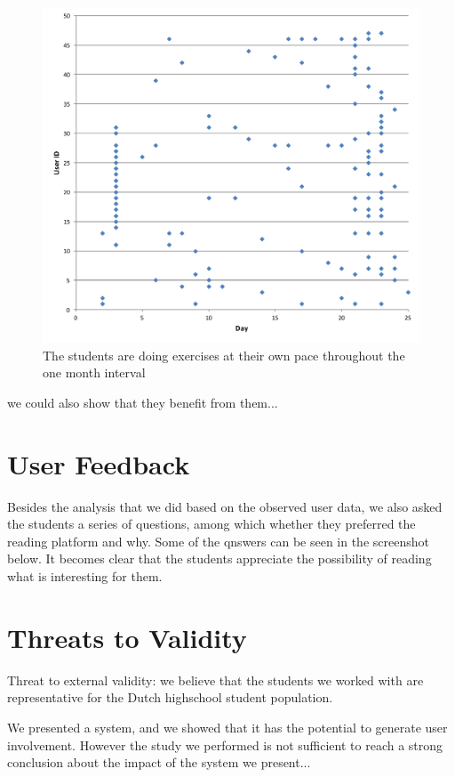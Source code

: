 \begin{figure}[h!]
\centering
  \includegraphics[width=\columnwidth]{figures/user_exercise_activity_vs_day.pdf}
  \caption{The students are doing exercises at their own pace throughout the one month interval }
\end{figure}

we could also show that they benefit from them... 



\section{User Feedback}

Besides the analysis that we did based on the observed user data, we also asked the students a series of questions, among which whether they preferred the reading platform and why. Some of the qnswers can be seen in the screenshot below. It becomes clear that the students appreciate the possibility of reading what is interesting for them.


\section{Threats to Validity}

Threat to external validity: we believe that the students we worked with are representative for the Dutch highschool student population. 

We presented a system, and we showed that it has the potential to generate user involvement. However the study we performed is not sufficient to reach a strong conclusion about the impact of the system we present... 

